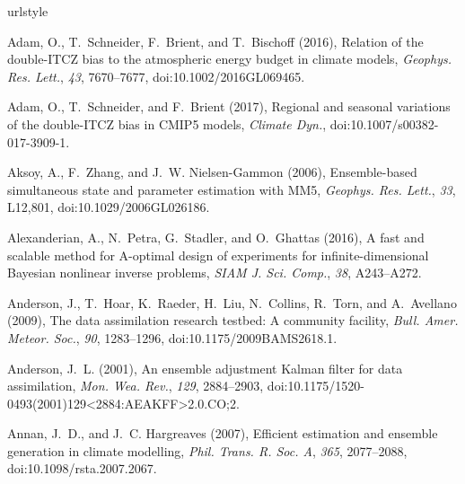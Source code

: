 \documentclass[draft]{agujournal}
\begin{document}
\begin{thebibliography}{196}
\providecommand{\natexlab}[1]{#1}
\expandafter\ifx\csname urlstyle\endcsname\relax
  \providecommand{\doi}[1]{doi:\discretionary{}{}{}#1}\else
  \providecommand{\doi}{doi:\discretionary{}{}{}\begingroup
  \urlstyle{rm}\Url}\fi

Adam, O., T.~Schneider, F.~Brient, and T.~Bischoff (2016), Relation of the
  double-{ITCZ} bias to the atmospheric energy budget in climate models,
  \textit{Geophys. Res. Lett.}, \textit{43}, 7670--7677,
  \doi{10.1002/2016GL069465}.

Adam, O., T.~Schneider, and F.~Brient (2017), Regional and seasonal variations
  of the double-{ITCZ} bias in {CMIP5} models, \textit{Climate Dyn.},
  \doi{10.1007/s00382-017-3909-1}.

Aksoy, A., F.~Zhang, and J.~W. Nielsen-Gammon (2006), Ensemble-based
  simultaneous state and parameter estimation with {MM5}, \textit{Geophys. Res.
  Lett.}, \textit{33}, L12,801, \doi{10.1029/2006GL026186}.

Alexanderian, A., N.~Petra, G.~Stadler, and O.~Ghattas (2016), A fast and
  scalable method for {A}-optimal design of experiments for
  infinite-dimensional {B}ayesian nonlinear inverse problems, \textit{SIAM J.
  Sci. Comp.}, \textit{38}, A243--A272.

Anderson, J., T.~Hoar, K.~Raeder, H.~Liu, N.~Collins, R.~Torn, and A.~Avellano
  (2009), The data assimilation research testbed: {A} community facility,
  \textit{Bull. Amer. Meteor. Soc.}, \textit{90}, 1283--1296,
  \doi{10.1175/2009BAMS2618.1}.

Anderson, J.~L. (2001), An ensemble adjustment {K}alman filter for data
  assimilation, \textit{Mon. Wea. Rev.}, \textit{129}, 2884--2903,
  \doi{10.1175/1520-0493(2001)129<2884:AEAKFF>2.0.CO;2}.

Annan, J.~D., and J.~C. Hargreaves (2007), Efficient estimation and ensemble
  generation in climate modelling, \textit{Phil. Trans. R. Soc. A},
  \textit{365}, 2077--2088, \doi{10.1098/rsta.2007.2067}.


\end{thebibliography}
\end{document}
